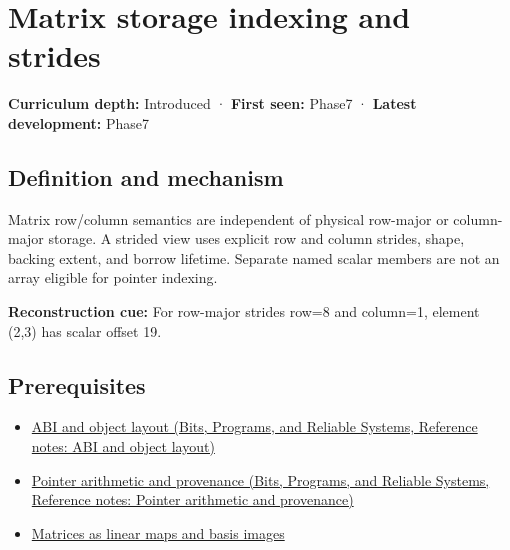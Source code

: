 \hypertarget{appendix-ffdc1d4e5350}{}\label{referencestart:appendix-ffdc1d4e5350}
\section{Matrix storage indexing and strides}\label{appendix-ffdc1d4e5350-matrix-storage-indexing-and-strides}

\hypertarget{appendix-ffdc1d4e5350-matrix-storage-indexing-and-strides}{}

\textbf{Curriculum depth:} Introduced · \textbf{First seen:} Phase7 · \textbf{Latest development:} Phase7

\begin{allmightroledefinition}

\subsection{Definition and mechanism}\label{appendix-ffdc1d4e5350-definition-and-mechanism}

\hypertarget{appendix-ffdc1d4e5350-definition-and-mechanism}{}

Matrix row/column semantics are independent of physical row-major or column-major storage. A strided view uses explicit row and column strides, shape, backing extent, and borrow lifetime. Separate named scalar members are not an array eligible for pointer indexing.

\end{allmightroledefinition}

\textbf{Reconstruction cue:} For row-major strides row=8 and column=1, element (2,3) has scalar offset 19.

\subsection{Prerequisites}\label{appendix-ffdc1d4e5350-prerequisites}

\hypertarget{appendix-ffdc1d4e5350-prerequisites}{}

\begin{itemize}
\tightlist
\item
  \href{../01-Bits-Programs-and-Reliable-Systems/main.pdf\#nameddest=appendix-c4ac6bb0fff8}{ABI and object layout (Bits, Programs, and Reliable Systems, Reference notes: ABI and object layout)}
\item
  \href{../01-Bits-Programs-and-Reliable-Systems/main.pdf\#nameddest=appendix-6af5921bc853}{Pointer arithmetic and provenance (Bits, Programs, and Reliable Systems, Reference notes: Pointer arithmetic and provenance)}
\item
  \hyperref[appendix-bd39c3bf5d64]{Matrices as linear maps and basis images}
\end{itemize}

